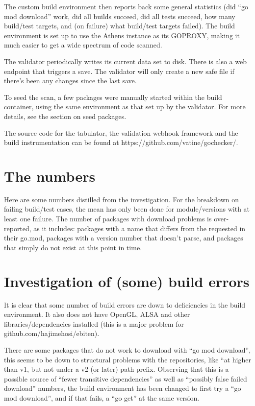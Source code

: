 \documentclass[a4paper]{paper}
\begin{document}
The custom build environment then reports back some general statistics
(did ``go mod download'' work, did all builds succeed, did all tests
succeed, how many build/test targets, and (on failure) what build/test
targets failed). The build environment is set up to use the Athens
instance as its GOPROXY, making it much easier to get a wide spectrum
of code scanned.

The validator periodically writes its current data set to disk. There
is also a web endpoint that triggers a save. The validator will only
create a new safe file if there's been any changes since the last
save.

To seed the scan, a few packages were manually started within the
build container, using the same environment as that set up by the
validator. For more details, see the section on seed packages.

The source code for the tabulator, the validation webhook framework
and the build instrumentation can be found at
https://github.com/vatine/gochecker/.

\section{The numbers}

Here are some numbers distilled from the investigation. For the
breakdown on failing build/test cases, the mean has only been done for
module/versions with at least one failure. The number of packages with
download problems is over-reported, as it includes: packages with a
name that differs from the requested in their go.mod, packages with a
version number that doesn't parse, and packages that simply do not
exist at this point in time.



\section{Investigation of (some) build errors}

It is clear that some number of build errors are down to deficiencies
in the build environment. It also does not have OpenGL, ALSA and other
libraries/dependencies installed (this is a major problem for
github.com/hajimehosi/ebiten).

There are some packages that do not work to download with ``go mod
download'', this seems to be down to structural problems with the
repositories, like ``at higher than v1, but not under a v2 (or later)
path prefix. Observing that this is a possible source of ``fewer
transitive dependencies'' as well as ``possibly false failed
download'' numbers, the build environment has been changed to first
try a ``go mod download'', and if that fails, a ``go get'' at the same
version.
\end{document}
